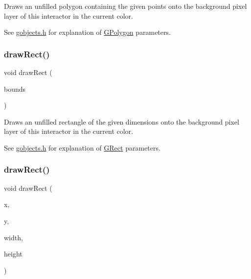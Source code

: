 Draws an unfilled polygon containing the given points onto the background pixel layer of this interactor in the current color. 

See \mbox{\hyperlink{gobjects_8h_source}{gobjects.\+h}} for explanation of \mbox{\hyperlink{classGPolygon}{G\+Polygon}} parameters. \mbox{\label{classGDrawingSurface_a3dd4cc5891149dfc36746264f7289877}} 
\subsubsection{\texorpdfstring{draw\+Rect()}{drawRect()}\hspace{0.1cm}{\footnotesize\ttfamily [1/2]}}
{\footnotesize\ttfamily void draw\+Rect (\begin{DoxyParamCaption}\item[{const \mbox{\hyperlink{structGRectangle}{G\+Rectangle}} \&}]{bounds }\end{DoxyParamCaption})\hspace{0.3cm}{\ttfamily [virtual]}}



Draws an unfilled rectangle of the given dimensions onto the background pixel layer of this interactor in the current color. 

See \mbox{\hyperlink{gobjects_8h_source}{gobjects.\+h}} for explanation of \mbox{\hyperlink{classGRect}{G\+Rect}} parameters. \mbox{\label{classGDrawingSurface_a4148e770ffc5474153aadd4814dbd708}} 
\subsubsection{\texorpdfstring{draw\+Rect()}{drawRect()}\hspace{0.1cm}{\footnotesize\ttfamily [2/2]}}
{\footnotesize\ttfamily void draw\+Rect (\begin{DoxyParamCaption}\item[{double}]{x,  }\item[{double}]{y,  }\item[{double}]{width,  }\item[{double}]{height }\end{DoxyParamCaption})\hspace{0.3cm}{\ttfamily [virtual]}}



